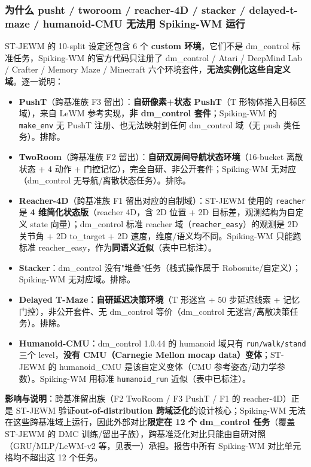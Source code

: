 \documentclass[11pt,a4paper]{article}
\begin{document}
\subsubsection{为什么 pusht / tworoom / reacher-4D / stacker / delayed-t-maze / humanoid-CMU 无法用 Spiking-WM 运行}

ST-JEWM 的 10-split 设定还包含 6 个 \textbf{custom 环境}，它们不是 dm\_control 标准任务，Spiking-WM 的官方代码只注册了 dm\_control / Atari / DeepMind Lab / Crafter / Memory Maze / Minecraft 六个环境套件，\textbf{无法实例化这些自定义域}。逐一说明：

\begin{itemize}[leftmargin=2em]
    \item \textbf{PushT}（跨基准族 F3 留出）：\textbf{自研像素+状态 PushT}（T 形物体推入目标区域），来自 LeWM 参考实现，\textbf{非 dm\_control 套件}；Spiking-WM 的 \texttt{make\_env} 无 PushT 注册、也无法映射到任何 dm\_control 域（无 push 类任务）。\textrightarrow 排除。
    \item \textbf{TwoRoom}（跨基准族 F2 留出）：\textbf{自研双房间导航状态环境}（16-bucket 离散状态 + 4 动作 + 门控记忆），完全自研、非公开套件；Spiking-WM 无对应（dm\_control 无导航/离散状态任务）。\textrightarrow 排除。
    \item \textbf{Reacher-4D}（跨基准族 F1 留出对应的自制域）：ST-JEWM 使用的 \texttt{reacher} 是 \textbf{4 维简化状态版}（reacher 4D，含 2D 位置 + 2D 目标差，观测结构为自定义 state 向量）；dm\_control 标准 reacher 域（\texttt{reacher\_easy}）的观测是 2D 关节角 + 2D to\_target + 2D 速度，维度/语义均不同。\textrightarrow Spiking-WM 只能跑标准 reacher\_easy，作为\textbf{同语义近似}（表中已标注）。
    \item \textbf{Stacker}：dm\_control 没有"堆叠"任务（栈式操作属于 Robosuite/自定义）；Spiking-WM 无对应域。\textrightarrow 排除。
    \item \textbf{Delayed T-Maze}：\textbf{自研延迟决策环境}（T 形迷宫 + 50 步延迟线索 + 记忆门控），非公开套件、无 dm\_control 等价（dm\_control 无迷宫/离散决策任务）。\textrightarrow 排除。
    \item \textbf{Humanoid-CMU}：dm\_control 1.0.44 的 humanoid 域只有 \texttt{run/walk/stand} 三个 level，\textbf{没有 CMU（Carnegie Mellon mocap data）变体}；ST-JEWM 的 humanoid\_CMU 是该自定义变体（CMU 参考姿态/动力学参数）。\textrightarrow Spiking-WM 用标准 \texttt{humanoid\_run} 近似（表中已标注）。
\end{itemize}

\textbf{影响与说明}：跨基准留出族（F2 TwoRoom / F3 PushT / F1 的 reacher-4D）正是 ST-JEWM 验证\textbf{out-of-distribution 跨域泛化}的设计核心；Spiking-WM 无法在这些跨基准域上运行，因此外部对比\textbf{限定在 12 个 dm\_control 任务}（覆盖 ST-JEWM 的 DMC 训练/留出子族），跨基准泛化对比只能由自研对照（GRU/MLP/LeWM-v2 等，见表一）承担。报告中所有 Spiking-WM 对比单元格均不超出这 12 个任务。
\end{document}
